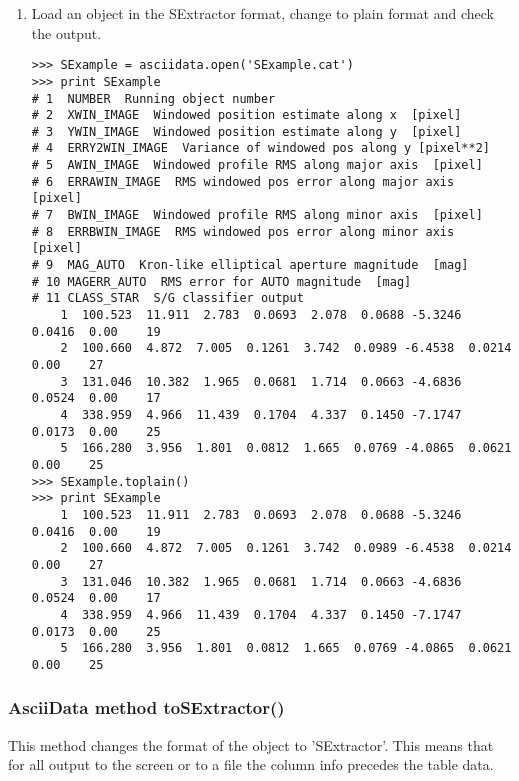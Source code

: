 \begin{enumerate}
\item Load an \ad object in the SExtractor format, change to plain format
and check the output.
\begin{small}
\begin{verbatim}
>>> SExample = asciidata.open('SExample.cat')
>>> print SExample
# 1  NUMBER  Running object number
# 2  XWIN_IMAGE  Windowed position estimate along x  [pixel]
# 3  YWIN_IMAGE  Windowed position estimate along y  [pixel]
# 4  ERRY2WIN_IMAGE  Variance of windowed pos along y [pixel**2]
# 5  AWIN_IMAGE  Windowed profile RMS along major axis  [pixel]
# 6  ERRAWIN_IMAGE  RMS windowed pos error along major axis  [pixel]
# 7  BWIN_IMAGE  Windowed profile RMS along minor axis  [pixel]
# 8  ERRBWIN_IMAGE  RMS windowed pos error along minor axis  [pixel]
# 9  MAG_AUTO  Kron-like elliptical aperture magnitude  [mag]
# 10 MAGERR_AUTO  RMS error for AUTO magnitude  [mag]
# 11 CLASS_STAR  S/G classifier output
    1  100.523  11.911  2.783  0.0693  2.078  0.0688 -5.3246  0.0416  0.00    19
    2  100.660  4.872  7.005  0.1261  3.742  0.0989 -6.4538  0.0214  0.00    27
    3  131.046  10.382  1.965  0.0681  1.714  0.0663 -4.6836  0.0524  0.00    17
    4  338.959  4.966  11.439  0.1704  4.337  0.1450 -7.1747  0.0173  0.00    25
    5  166.280  3.956  1.801  0.0812  1.665  0.0769 -4.0865  0.0621  0.00    25
>>> SExample.toplain()
>>> print SExample
    1  100.523  11.911  2.783  0.0693  2.078  0.0688 -5.3246  0.0416  0.00    19
    2  100.660  4.872  7.005  0.1261  3.742  0.0989 -6.4538  0.0214  0.00    27
    3  131.046  10.382  1.965  0.0681  1.714  0.0663 -4.6836  0.0524  0.00    17
    4  338.959  4.966  11.439  0.1704  4.337  0.1450 -7.1747  0.0173  0.00    25
    5  166.280  3.956  1.801  0.0812  1.665  0.0769 -4.0865  0.0621  0.00    25
\end{verbatim}
\end{small}
\end{enumerate}


\subsubsection{AsciiData method toSExtractor()}
\label{adm_toSExtractor}

This method changes the format of the \ad object to 'SExtractor'. This means
that for all output to the screen or to a file the column info precedes the table
data.

